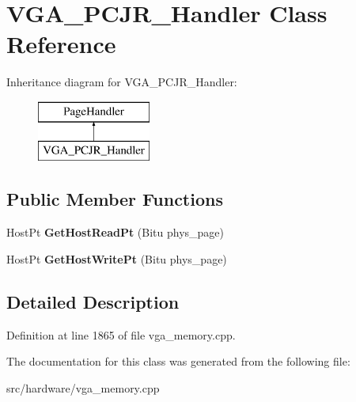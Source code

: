 \hypertarget{classVGA__PCJR__Handler}{\section{V\-G\-A\-\_\-\-P\-C\-J\-R\-\_\-\-Handler Class Reference}
\label{classVGA__PCJR__Handler}
}
Inheritance diagram for V\-G\-A\-\_\-\-P\-C\-J\-R\-\_\-\-Handler\-:\begin{figure}[H]
\begin{center}
\leavevmode
\includegraphics[height=2.000000cm]{classVGA__PCJR__Handler}
\end{center}
\end{figure}
\subsection*{Public Member Functions}
\begin{DoxyCompactItemize}
\item 
\hypertarget{classVGA__PCJR__Handler_a7af2542f4c4e96999dbda7fff177d521}{Host\-Pt {\bfseries Get\-Host\-Read\-Pt} (Bitu phys\-\_\-page)}\label{classVGA__PCJR__Handler_a7af2542f4c4e96999dbda7fff177d521}

\item 
\hypertarget{classVGA__PCJR__Handler_aed69d78cd3e5880a41aa82b1a99d93b3}{Host\-Pt {\bfseries Get\-Host\-Write\-Pt} (Bitu phys\-\_\-page)}\label{classVGA__PCJR__Handler_aed69d78cd3e5880a41aa82b1a99d93b3}

\end{DoxyCompactItemize}


\subsection{Detailed Description}


Definition at line 1865 of file vga\-\_\-memory.\-cpp.



The documentation for this class was generated from the following file\-:\begin{DoxyCompactItemize}
\item 
src/hardware/vga\-\_\-memory.\-cpp\end{DoxyCompactItemize}
